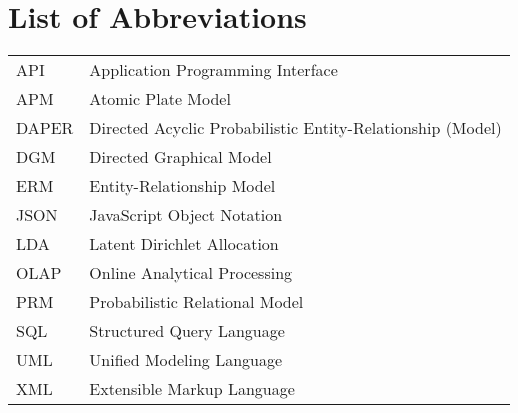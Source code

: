\section*{List of Abbreviations}

\begin{tabular}{ll}
API & Application Programming Interface\\
APM & Atomic Plate Model\\
DAPER & Directed Acyclic Probabilistic Entity-Relationship (Model)\\
DGM & Directed Graphical Model\\
ERM & Entity-Relationship Model\\
JSON & JavaScript Object Notation\\
LDA & Latent Dirichlet Allocation\\
OLAP & Online Analytical Processing\\
PRM & Probabilistic Relational Model\\
SQL & Structured Query Language\\
UML & Unified Modeling Language\\
XML & Extensible Markup Language

\end{tabular}